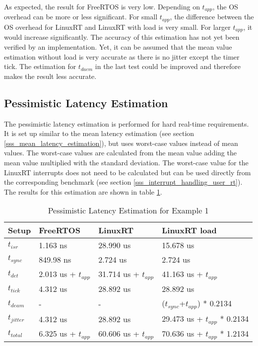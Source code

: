 As expected, the result for FreeRTOS is very low. 
Depending on $t_{app}$, the \ac{OS} overhead can be more or less significant. 
For small $t_{app}$, the difference between the \ac{OS} overhead for LinuxRT and LinuxRT with load is very small. 
For larger $t_{app}$, it would increase significantly. 
The accuracy of this estimation has not yet been verified by an implementation.
Yet, it can be assumed that the mean value estimation without load is very accurate as there is no jitter except the timer tick.
The estimation for $t_{daem}$ in the last test could be improved and therefore makes the result less accurate.
   
\subsection{Pessimistic Latency Estimation}\label{sss_pessimistic_latency_estimation}
The pessimistic latency estimation is performed for hard real-time requirements. 
It is set up similar to the mean latency estimation (see section \ref{sss_mean_latency_estimation}), but uses worst-case values instead of mean values. 
The worst-case values are calculated from the mean value adding the mean value multiplied with the standard deviation.
The worst-case value for the LinuxRT interrupts does not need to be calculated but can be used directly from the corresponding benchmark (see section \ref{sss_interrupt_handling_user_rt}). 
The results for this estimation are shown in table \ref{tab_example1_pessimistic}.  
 \begin{table}[htbp]
	\centering
		\begin{tabular}{|l|l|l|l|}
			\hline
				Setup					& FreeRTOS 								& LinuxRT 							& LinuxRT load  \\
				\hline 
				$t_{isr}$ 		& 1.163 ns 								& 28.990 us 						& 15.678 us			\\
			  $t_{sync}$		& 849.98 ns	  						& 2.724 us 				 			& 2.724 us			\\
			  \hline 
			  $t_{det}$			& 2.013 us + $t_{app}$		& 31.714 us + $t_{app}$	& 41.163 us	+ $t_{app}$		\\ 
			  \hline
			  \hline
			  $t_{tick}$		& 4.312 us								& 28.892 us 					  & 28.892 us											\\
			  $t_{deam}$		& -				  							& - 				 						& ($t_{sync}$+$t_{app}$) * 0.2134	\\ 
				\hline 
			  $t_{jitter}$	& 4.312 us  							& 28.892 us						  & 29.473 us	+ $t_{app}$ * 0.2134	\\ 
			  \hline
			  \hline 
			  $t_{total}$		& 6.325 us + $t_{app}$	 & 60.606 us + $t_{app}$  &	70.636 us + $t_{app}$ * 1.2134 	\\ 
			\hline
		\end{tabular}
	\caption{Pessimistic Latency Estimation for Example 1}
	\label{tab_example1_pessimistic}
\end{table}

